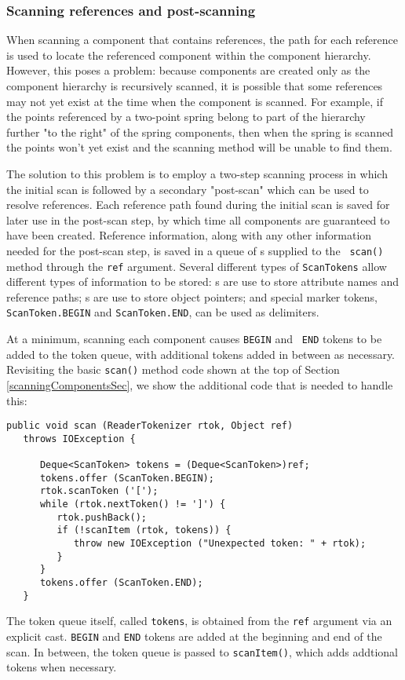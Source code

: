 \documentclass{article}
\begin{document}
\subsubsection{Scanning references and post-scanning}
\label{scanningReferencesSec}

When scanning a component that contains references, the path for each
reference is used to locate the referenced component within
the component hierarchy.
However, this poses a problem: because components are
created only as the component hierarchy is recursively scanned, it is
possible that some references may not yet exist at
the time when the component is scanned. For example, if the points
referenced by a two-point spring belong to part of the hierarchy
further "to the right" of the spring components, then when the
spring is scanned the points won't yet exist and the scanning method
will be unable to find them.

The solution to this problem is to employ a two-step scanning process
in which the initial scan is followed by a secondary "post-scan" which
can be used to resolve references. Each reference path found during
the initial scan is saved for later use in the post-scan step, by
which time all components are guaranteed to have been
created. Reference information, along with any other information
needed for the post-scan step, is saved in a queue of
s supplied to the {\tt
scan()} method through the {\tt ref} argument. Several different types
of {\tt ScanTokens} allow different types of information to be stored:
s are use to store
attribute names and reference paths;
s are use to store object
pointers; and special marker tokens, {\tt ScanToken.BEGIN}
and {\tt ScanToken.END}, can be used as delimiters.

At a minimum, scanning each component causes {\tt BEGIN} and {\tt
END} tokens to be added to the token queue, with additional
tokens added in between as necessary.
Revisiting the basic {\tt scan()} method code
shown at the top of Section \ref{scanningComponentsSec},
we show the additional code that is needed to handle this:
\begin{lstlisting}[]
   public void scan (ReaderTokenizer rtok, Object ref) 
   throws IOException {

      Deque<ScanToken> tokens = (Deque<ScanToken>)ref;
      tokens.offer (ScanToken.BEGIN);
      rtok.scanToken ('[');
      while (rtok.nextToken() != ']') {
         rtok.pushBack();
         if (!scanItem (rtok, tokens)) {
            throw new IOException ("Unexpected token: " + rtok);
         }
      }
      tokens.offer (ScanToken.END);
   }
\end{lstlisting}
The token queue itself, called {\tt tokens}, is obtained from the
{\tt ref} argument via an explicit cast.
{\tt BEGIN} and {\tt END} tokens are added at the
beginning and end of the scan. In between, the token queue
is passed to {\tt scanItem()}, which adds addtional tokens
when necessary. 
\end{document}
